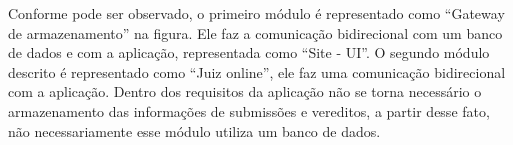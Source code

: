 Conforme pode ser observado, o primeiro módulo é representado como ``Gateway de armazenamento'' na figura. Ele faz a comunicação bidirecional com um banco de dados e com a aplicação, representada como ``Site - UI''. O segundo módulo descrito é representado como ``Juiz online'', ele faz uma comunicação bidirecional com a aplicação. Dentro dos requisitos da aplicação não se torna necessário o armazenamento das informações de submissões e vereditos, a partir desse fato, não necessariamente esse módulo utiliza um banco de dados.